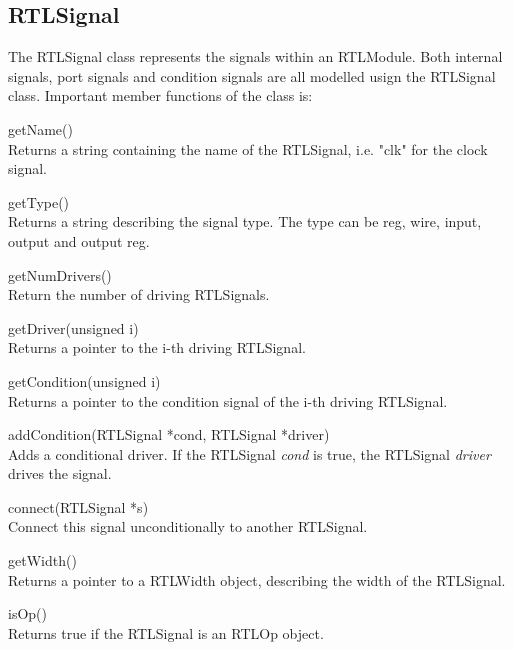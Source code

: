 \subsection{RTLSignal}
The RTLSignal class represents the signals within an RTLModule. Both internal signals, port signals and condition signals are all modelled usign the RTLSignal class. Important member functions of the class is:
\begin{compactdesc}
    \item[getName()] \hfill \\
    Returns a string containing the name of the RTLSignal, i.e. "clk" for the clock signal.
    \item[getType()] \hfill \\
    Returns a string describing the signal type. The type can be reg, wire, input, output and output reg.
    \item[getNumDrivers()] \hfill \\
    Return the number of driving RTLSignals. 
    \item[getDriver(unsigned i)] \hfill \\
    Returns a pointer to the i-th driving RTLSignal.
    \item[getCondition(unsigned i)] \hfill \\
    Returns a pointer to the condition signal of the i-th driving RTLSignal.
    \item[addCondition(RTLSignal *cond, RTLSignal *driver)] \hfill \\
    Adds a conditional driver. If the RTLSignal \textit{cond} is true, the RTLSignal \textit{driver} drives the signal. 
    \item[connect(RTLSignal *s)] \hfill \\
    Connect this signal unconditionally to another RTLSignal.
    \item[getWidth()] \hfill \\
    Returns a pointer to a RTLWidth object, describing the width of the RTLSignal.
    \item[isOp()] \hfill \\
    Returns true if the RTLSignal is an RTLOp object.
\end{compactdesc}
